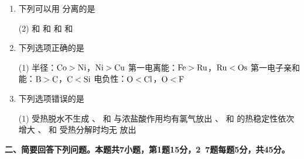 \begin{enumerate}[label=\arabic*., itemsep=1.5ex]
    \item 下列可以用  分离的是
    \begin{tasks}(2)
        \task {} 和 
        \task {} 和 
        \task {} 和 
        \task {} 和 
    \end{tasks}

    \item 下列选项正确的是
    \begin{tasks}(1)
        \task 半径：$\ce{Co} > \ce{Ni}$，$\ce{Ni} > \ce{Cu}$
        \task 第一电离能：$\ce{Fe} > \ce{Ru}$，$\ce{Ru} < \ce{Os}$
        \task 第一电子亲和能：$\ce{B} > \ce{C}$，$\ce{C} < \ce{Si}$
        \task 电负性：$\ce{O} < \ce{Cl}$，$\ce{O} < \ce{F}$
    \end{tasks}

    \item 下列选项错误的是
    \begin{tasks}(1)
        \task {} 受热脱水不生成 
        \task {}、 和  与浓盐酸作用均有氯气放出
        \task {}、 和  的热稳定性依次增大
        \task {}、 和  受热分解时均无  放出
    \end{tasks}
\end{enumerate}

\vspace{0.5cm}
\noindent\textbf{二、简要回答下列问题。本题共7小题，第1题15分，2~7题每题5分，共45分。}

